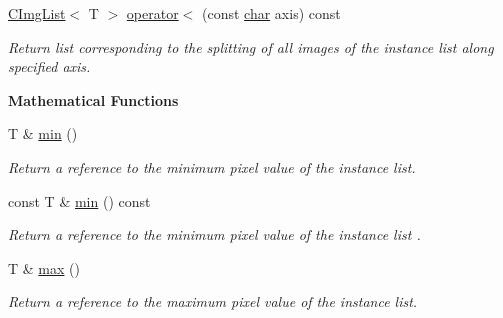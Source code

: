 \begin{Indent}
\begin{DoxyCompactItemize}
\hyperlink{structcimg__library__suffixed_1_1CImgList}{C\+Img\+List}$<$ T $>$ \hyperlink{structcimg__library__suffixed_1_1CImgList_a3266dc5ed4eb07625e6ad2cd310a65fb}{operator$<$} (const \hyperlink{classchar}{char} axis) const
\begin{DoxyCompactList}\small\item\em Return list corresponding to the splitting of all images of the instance list along specified axis. \end{DoxyCompactList}\end{DoxyCompactItemize}
\end{Indent}
\begin{Indent}\textbf{ Mathematical Functions}\par
\begin{DoxyCompactItemize}
\item 
\mbox{\label{structcimg__library__suffixed_1_1CImgList_a715550d0beb855cdab7086b41527a0b4}} 
T \& \hyperlink{structcimg__library__suffixed_1_1CImgList_a715550d0beb855cdab7086b41527a0b4}{min} ()
\begin{DoxyCompactList}\small\item\em Return a reference to the minimum pixel value of the instance list. \end{DoxyCompactList}\item 
\mbox{\label{structcimg__library__suffixed_1_1CImgList_a840faaa2cfea6c767371b888d0760fde}} 
const T \& \hyperlink{structcimg__library__suffixed_1_1CImgList_a840faaa2cfea6c767371b888d0760fde}{min} () const
\begin{DoxyCompactList}\small\item\em Return a reference to the minimum pixel value of the instance list . \end{DoxyCompactList}\item 
\mbox{\label{structcimg__library__suffixed_1_1CImgList_a597c6147924170366dbada1878a7dc45}} 
T \& \hyperlink{structcimg__library__suffixed_1_1CImgList_a597c6147924170366dbada1878a7dc45}{max} ()
\begin{DoxyCompactList}\small\item\em Return a reference to the maximum pixel value of the instance list. \end{DoxyCompactList}\item 

\end{DoxyCompactItemize}
\end{Indent}
